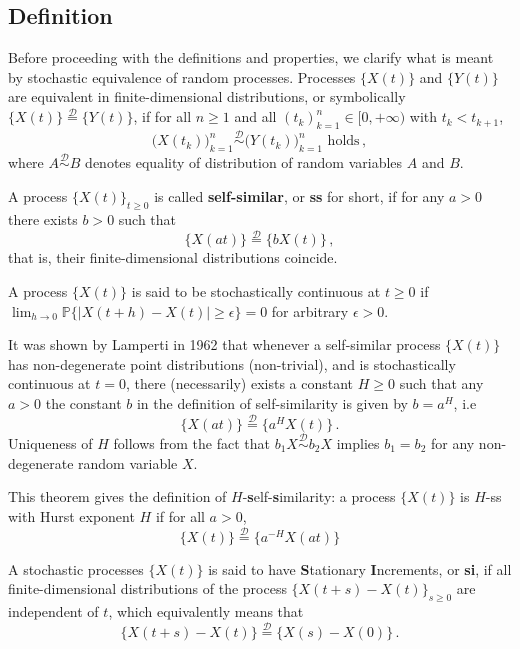 \documentclass[a4paper]{article}
\newcommand{\pr}{\mathbb{P}}
\newcommand{\Dcal}{\mathcal{D}}
\begin{document}
\subsection{Definition} %
\label{sub:definition}

Before proceeding with the definitions and properties, we clarify what is meant by
stochastic equivalence of random processes. Processes $\bigl\{X(t)\bigr\}$ and
$\bigl\{Y(t)\bigr\}$ are equivalent in finite-dimensional distributions, or symbolically
$\{X(t)\} \overset{\Dcal}{=} \{Y(t)\}$, if for all $n\geq1$ and all $(t_k)_{k=1}^n\in [0,+\infty)$
with $t_k<t_{k+1}$,
\[ \bigl(X(t_k)\bigr)_{k=1}^n \overset{\Dcal}{\sim} \bigl(Y(t_k)\bigr)_{k=1}^n \text{ holds}\,,\]
where $A\overset{\Dcal}{\sim} B$ denotes equality of distribution of random variables
$A$ and $B$.

A process $\bigl\{X(t)\bigr\}_{t\geq 0}$ is called \textbf{self-similar}, or \textbf{ss}
for short, if for any $a>0$ there exists $b>0$ such that
\[ \bigl\{X(at)\bigr\} \overset{\Dcal}{=} \bigl\{b X(t)\bigr\} \,,\]
that is, their finite-dimensional distributions coincide.

A process $\bigl\{X(t)\bigr\}$ is said to be stochastically continuous at $t\geq0$ if
$\lim_{h\to 0} \pr\bigl\{ |X(t+h)-X(t)| \geq \epsilon \bigr\} = 0$ for arbitrary
$\epsilon > 0$.

It was shown by Lamperti in 1962 that whenever a self-similar process $\bigl\{X(t)\bigr\}$
has non-degenerate point distributions (non-trivial), and is stochastically continuous
at $t=0$, there (necessarily) exists a constant $H\geq 0$ such that any $a>0$ the constant
$b$ in the definition of self-similarity is given by $b=a^H$, i.e
\[ \bigl\{X(at)\bigr\} \overset{\Dcal}{=} \bigl\{a^H X(t)\bigr\} \,. \]
Uniqueness of $H$ follows from the fact that $b_1 X\overset{\Dcal}{\sim} b_2 X$ implies
$b_1=b_2$ for any non-degenerate random variable $X$.

This theorem gives the definition of $H$-\textbf{s}elf-\textbf{s}imilarity: \label{def:hsssi}
a process $\bigl\{X(t)\bigr\}$ is $H$-ss with Hurst exponent $H$ if for all $a>0$,
\[ \bigl\{X(t)\bigr\} \overset{\Dcal}{=} \bigl\{a^{-H} X(at)\bigr\} \]

A stochastic processes $\bigl\{X(t)\bigr\}$ is said to have \textbf{S}tationary
\textbf{I}ncrements, or \textbf{si}, if all finite-dimensional distributions of
the process $\bigl\{X(t+s) - X(t)\bigr\}_{s\geq0}$ are independent of $t$, which
equivalently means that
\[ \bigl\{X(t+s)-X(t)\bigr\} \overset{\Dcal}{=} \bigl\{X(s)-X(0)\bigr\} \,. \]
\end{document}
